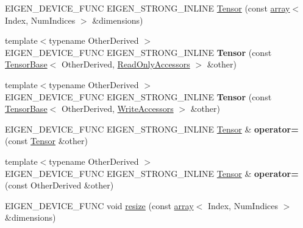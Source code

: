 \begin{DoxyCompactItemize}
\item 
E\+I\+G\+E\+N\+\_\+\+D\+E\+V\+I\+C\+E\+\_\+\+F\+U\+NC E\+I\+G\+E\+N\+\_\+\+S\+T\+R\+O\+N\+G\+\_\+\+I\+N\+L\+I\+NE \hyperlink{class_eigen_1_1_tensor_a6ef6b578cd0ca367842b0d8888e22195}{Tensor} (const \hyperlink{class_eigen_1_1array}{array}$<$ Index, Num\+Indices $>$ \&dimensions)
\item 
\mbox{\label{class_eigen_1_1_tensor_ad956c232d59f35a204b80badb3ffd520}} 
{\footnotesize template$<$typename Other\+Derived $>$ }\\E\+I\+G\+E\+N\+\_\+\+D\+E\+V\+I\+C\+E\+\_\+\+F\+U\+NC E\+I\+G\+E\+N\+\_\+\+S\+T\+R\+O\+N\+G\+\_\+\+I\+N\+L\+I\+NE {\bfseries Tensor} (const \hyperlink{class_eigen_1_1_tensor_base}{Tensor\+Base}$<$ Other\+Derived, \hyperlink{group__enums_gga9f93eac38eb83deb0e8dbd42ddf11d5da42865f87356ad7e585a1bfbfd1b81699}{Read\+Only\+Accessors} $>$ \&other)
\item 
\mbox{\label{class_eigen_1_1_tensor_aa46777190f6226871d7fc0902d7d8172}} 
{\footnotesize template$<$typename Other\+Derived $>$ }\\E\+I\+G\+E\+N\+\_\+\+D\+E\+V\+I\+C\+E\+\_\+\+F\+U\+NC E\+I\+G\+E\+N\+\_\+\+S\+T\+R\+O\+N\+G\+\_\+\+I\+N\+L\+I\+NE {\bfseries Tensor} (const \hyperlink{class_eigen_1_1_tensor_base}{Tensor\+Base}$<$ Other\+Derived, \hyperlink{group__enums_gga9f93eac38eb83deb0e8dbd42ddf11d5da2c59ef3697d65866c3a8e16eda7881ab}{Write\+Accessors} $>$ \&other)
\item 
\mbox{\label{class_eigen_1_1_tensor_a0c493c8f67658fc681eb644b138bec79}} 
E\+I\+G\+E\+N\+\_\+\+D\+E\+V\+I\+C\+E\+\_\+\+F\+U\+NC E\+I\+G\+E\+N\+\_\+\+S\+T\+R\+O\+N\+G\+\_\+\+I\+N\+L\+I\+NE \hyperlink{class_eigen_1_1_tensor}{Tensor} \& {\bfseries operator=} (const \hyperlink{class_eigen_1_1_tensor}{Tensor} \&other)
\item 
\mbox{\label{class_eigen_1_1_tensor_a3f5b5cb98da5ee3c9ee3e09abe9e73fd}} 
{\footnotesize template$<$typename Other\+Derived $>$ }\\E\+I\+G\+E\+N\+\_\+\+D\+E\+V\+I\+C\+E\+\_\+\+F\+U\+NC E\+I\+G\+E\+N\+\_\+\+S\+T\+R\+O\+N\+G\+\_\+\+I\+N\+L\+I\+NE \hyperlink{class_eigen_1_1_tensor}{Tensor} \& {\bfseries operator=} (const Other\+Derived \&other)
\item 
E\+I\+G\+E\+N\+\_\+\+D\+E\+V\+I\+C\+E\+\_\+\+F\+U\+NC void \hyperlink{class_eigen_1_1_tensor_a5ab1ec6dc9b05d5e4db3600bc9d2cc6b}{resize} (const \hyperlink{class_eigen_1_1array}{array}$<$ Index, Num\+Indices $>$ \&dimensions)

\end{DoxyCompactItemize}
